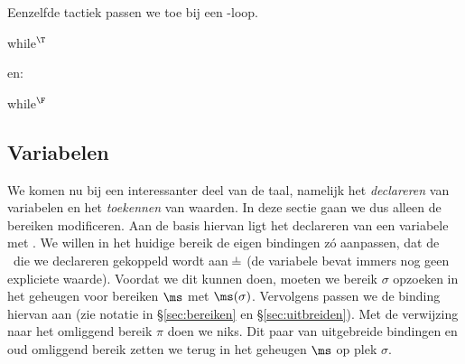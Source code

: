 Eenzelfde tactiek passen we toe bij een \WHILE-loop.

\begin{NSAxiom}{while$^\T$}
  \begin{prooftree}
  \end{prooftree}
  \begin{NSConditions}
  \end{NSConditions}
\end{NSAxiom}

en:

\begin{NSAxiom}{while$^\F$}
  \begin{prooftree}
  \end{prooftree}
  \begin{NSConditions}
  \end{NSConditions}
\end{NSAxiom}

\subsection{Variabelen}

We komen nu bij een interessanter deel van de taal, namelijk het \emph{declareren} van variabelen en het \emph{toekennen} van waarden. In deze sectie gaan we dus alleen de bereiken modificeren. Aan de basis hiervan ligt het declareren van een variabele met \LOCAL. We willen in het huidige bereik de eigen bindingen zó aanpassen, dat de \Id\ die we declareren gekoppeld wordt aan $\nil$ (de variabele bevat immers nog geen expliciete waarde). Voordat we dit kunnen doen, moeten we bereik $\sigma$ opzoeken in het geheugen voor bereiken $\ms$ met $\ms(\sigma)$. Vervolgens passen we de binding hiervan aan (zie notatie in §\ref{sec:bereiken} en §\ref{sec:uitbreiden}). Met de verwijzing naar het omliggend bereik $\pi$ doen we niks. Dit paar van uitgebreide bindingen en oud omliggend bereik zetten we terug in het geheugen $\ms$ op plek $\sigma$.

